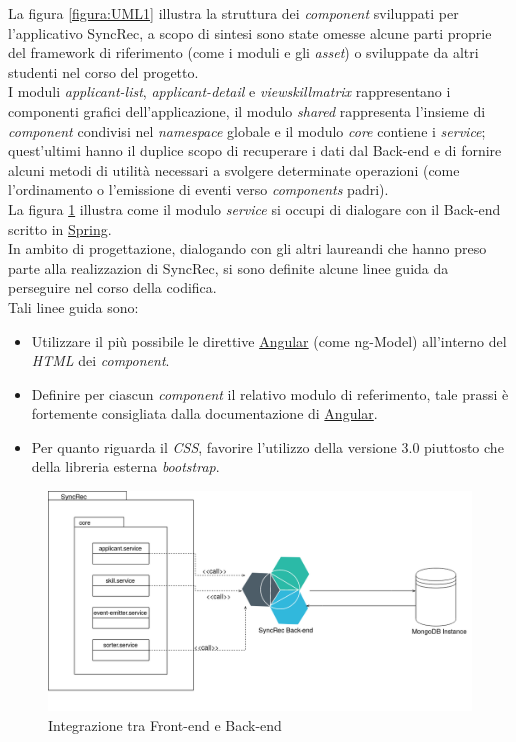 La figura \ref{figura:UML1} illustra la struttura dei \textit{component} sviluppati per l'applicativo SyncRec, a scopo di sintesi sono state omesse alcune parti proprie del \gls{framework} di riferimento (come i moduli e gli \textit{asset}) o sviluppate da altri studenti nel corso del progetto.\\
I moduli \textit{applicant-list}, \textit{applicant-detail} e \textit{viewskillmatrix} rappresentano i componenti grafici dell'applicazione, il modulo \textit{shared} rappresenta l'insieme di \textit{component} condivisi nel \textit{namespace} globale e il modulo \textit{core} contiene i \textit{service}; quest'ultimi hanno il duplice scopo di recuperare i dati dal \gls{Back-end} e di fornire alcuni metodi di utilità necessari a svolgere determinate operazioni (come l'ordinamento o l'emissione di eventi verso \textit{components} padri).\\
La figura \ref{figura:UML2} illustra come il modulo \textit{service} si occupi di dialogare con il \gls{Back-end} scritto in \hyperref[tech-spring]{Spring}.\\
In ambito di progettazione, dialogando con gli altri laureandi che hanno preso parte alla realizzazion di SyncRec, si sono definite alcune linee guida da perseguire nel corso della codifica.\\
Tali linee guida sono:
\begin{itemize}
	\item Utilizzare il più possibile le direttive \hyperref[angular]{Angular} (come \gls{ng-Model}) all'interno del \textit{HTML} dei \textit{component}.
	\item Definire per ciascun \textit{component} il relativo modulo di referimento, tale prassi è fortemente consigliata dalla documentazione di \hyperref[angular]{Angular}.
	\item Per quanto riguarda il \textit{CSS}, favorire l'utilizzo della versione 3.0 piuttosto che della libreria esterna \textit{bootstrap}.
\end{itemize}

\begin{figure}[!h] 
	\centering 
	\includegraphics[width=1\columnwidth]{immagini/usecase/UML2} 
	\caption{Integrazione tra Front-end e Back-end}
	\label{figura:UML2}
\end{figure}


